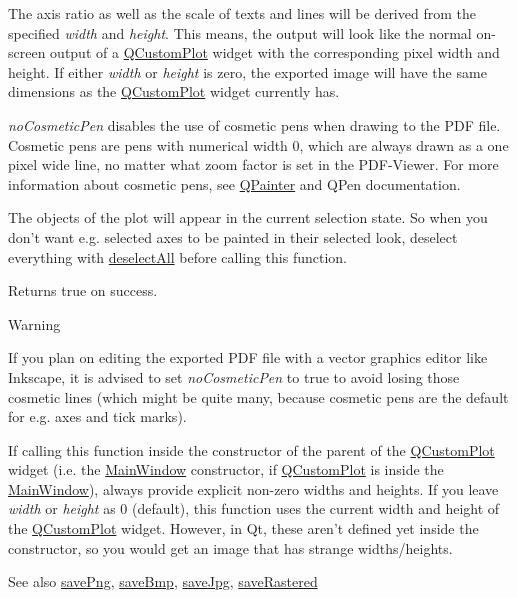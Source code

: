 The axis ratio as well as the scale of texts and lines will be derived from the specified {\itshape width} and {\itshape height}. This means, the output will look like the normal on-\/screen output of a \hyperlink{a00030_d8/d00/a00186}{Q\+Custom\+Plot} widget with the corresponding pixel width and height. If either {\itshape width} or {\itshape height} is zero, the exported image will have the same dimensions as the \hyperlink{a00030_d8/d00/a00186}{Q\+Custom\+Plot} widget currently has.

{\itshape no\+Cosmetic\+Pen} disables the use of cosmetic pens when drawing to the P\+D\+F file. Cosmetic pens are pens with numerical width 0, which are always drawn as a one pixel wide line, no matter what zoom factor is set in the P\+D\+F-\/\+Viewer. For more information about cosmetic pens, see \hyperlink{a00060}{Q\+Painter} and Q\+Pen documentation.

The objects of the plot will appear in the current selection state. So when you don't want e.\+g. selected axes to be painted in their selected look, deselect everything with \hyperlink{a00116_a9d4808ab925b003054085246c92a257c}{deselect\+All} before calling this function.

Returns true on success.

\begin{DoxyWarning}{Warning}
\begin{DoxyItemize}
\item If you plan on editing the exported P\+D\+F file with a vector graphics editor like Inkscape, it is advised to set {\itshape no\+Cosmetic\+Pen} to true to avoid losing those cosmetic lines (which might be quite many, because cosmetic pens are the default for e.\+g. axes and tick marks). \item If calling this function inside the constructor of the parent of the \hyperlink{a00030_d8/d00/a00186}{Q\+Custom\+Plot} widget (i.\+e. the \hyperlink{a00017}{Main\+Window} constructor, if \hyperlink{a00030_d8/d00/a00186}{Q\+Custom\+Plot} is inside the \hyperlink{a00017}{Main\+Window}), always provide explicit non-\/zero widths and heights. If you leave {\itshape width} or {\itshape height} as 0 (default), this function uses the current width and height of the \hyperlink{a00030_d8/d00/a00186}{Q\+Custom\+Plot} widget. However, in Qt, these aren't defined yet inside the constructor, so you would get an image that has strange widths/heights.\end{DoxyItemize}

\end{DoxyWarning}
\begin{DoxySeeAlso}{See also}
\hyperlink{a00116_a7636261aff1f6d25c9da749ece3fc8b8}{save\+Png}, \hyperlink{a00116_a6629d9e8e6da4bf18055ee0257fdce9a}{save\+Bmp}, \hyperlink{a00116_a490c722092d1771e8ce4a7a73dfd84ab}{save\+Jpg}, \hyperlink{a00116_ab528b84cf92baabe29b1d0ef2f77c93e}{save\+Rastered} 
\end{DoxySeeAlso}


